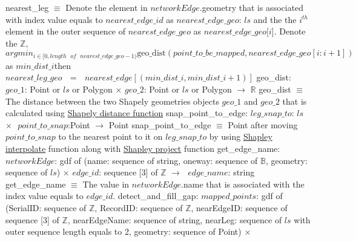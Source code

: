 \documentclass[12pt, titlepage]{article}
\begin{document}
nearest\_leg $\equiv$ Denote the element in $networkEdge$.geometry that is associated with index value equals to $nearest\_edge\_id$ as $nearest\_edge\_geo$: $ls$ and the the $i^{th}$ element in the outer sequence of $nearest\_edge\_geo$ as $nearest\_edge\_geo$[$i$]. \newline
Denote the $\mathbb{Z}$,\newline $argmin_{i\in[0,length\text{ }of\text{ }nearest\_edge\_geo-1)}\text{geo\_dist}(point\_to\_be\_mapped,nearest\_edge\_geo[i:i+1])$ as $min\_dist\_i$\newline then
$nearest\_leg\_geo\text{ }=\text{ }nearest\_edge[(min\_dist\_i, min\_dist\_i + 1)]$\newline\newline
geo\_dist: $geo\_1$: Point or $ls$ or Polygon $\times$ $geo\_2$: Point or $ls$ or Polygon $\rightarrow$ $\mathbb{R}$\newline
geo\_dist $\equiv$ The distance between the two Shapely geometries objects $geo\_1$ and $geo\_2$ that is calculated using \href{https://shapely.readthedocs.io/en/stable/manual.html#object.distance}{Shapely distance function} \newline\newline
snap\_point\_to\_edge: $leg\_snap\_to$: $ls$ $\times\text{ }point\_to\_snap$:Point $\rightarrow$ Point\newline
snap\_point\_to\_edge $\equiv$ Point after moving $point\_to\_snap$ to the nearest point to it on $leg\_snap\_to$ by using \href{https://shapely.readthedocs.io/en/stable/manual.html#object.interpolate}{Shapley interpolate} function along with \href{https://shapely.readthedocs.io/en/stable/manual.html#object.interpolate}{Shapley project} function\newline\newline
get\_edge\_name: $networkEdge$: gdf of (name: sequence of string, oneway: sequence of $\mathbb{B}$, geometry: sequence of $ls$) $\times$ $edge\_id$: sequence [3] of $\mathbb{Z}$ $\rightarrow\text{ }edge\_name$: string\newline
get\_edge\_name $\equiv$ The value in $networkEdge$.name that is associated with the index value equals to $edge\_id$.\newline\newline
detect\_and\_fill\_gap: \newline
$mapped\_points$: gdf of (SerialID: sequence of $\mathbb{Z}$, RecordID: sequence of $\mathbb{Z}$, nearEdgeID: sequence of sequence [3] of $\mathbb{Z}$, nearEdgeName: sequence of string, nearLeg: sequence of $ls$ with outer sequence length equals to 2, geometry: sequence of Point) $\times$ 
\end{document}
